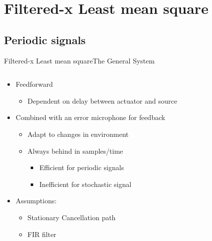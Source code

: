 \section{Filtered-x Least mean square}


\subsection{Periodic signals}
\begin{frame}{Filtered-x Least mean square}{The General System}
	\begin{columns}
		\begin{column}{0.5\textwidth}		

		\begin{itemize}
		\item Feedforward
		\begin{itemize}
		\item Dependent on delay between actuator and source		
		\end{itemize}
		\item Combined with an error microphone for feedback
		\begin{itemize}
		\item Adapt to changes in environment
		\item Always behind in samples/time 		
		\begin{itemize}
		\item Efficient for periodic signals
		\item Inefficient for stochastic signal 
		\end{itemize}	
		\end{itemize}
		\item Assumptions:
		\begin{itemize}
		\item Stationary Cancellation path
		\item FIR filter
		\end{itemize}

		\end{itemize}

		
		\end{column}
		\begin{column}{0.5\textwidth}
		\resizebox{1.1\columnwidth}{!}{	
		
		}
		\end{column}
	\end{columns}
\end{frame}

